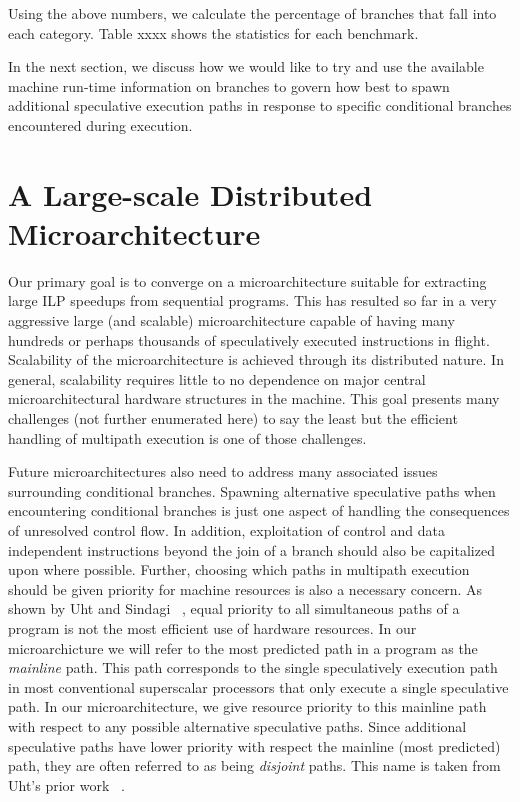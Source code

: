 \documentclass[10pt,dvips]{article}
\begin{document}
Using the above numbers, we calculate the percentage of branches 
that fall into each category.  
Table xxxx shows the statistics for each benchmark.  



In the next section, we discuss how we would like to try and
use the available machine run-time information on branches to
govern how best to spawn additional speculative execution paths
in response to specific conditional branches encountered during execution.
%
\section{A Large-scale Distributed Microarchitecture}
%
Our primary goal is to converge on a microarchitecture suitable
for extracting large ILP speedups from sequential programs.
This has resulted so far in a very aggressive large (and scalable)
microarchitecture capable of having many hundreds or perhaps thousands
of speculatively executed instructions in flight.  Scalability
of the microarchitecture is achieved through its distributed nature.
In general, scalability requires little to no dependence on major
central microarchitectural hardware structures in the machine.
This goal presents many challenges (not further enumerated here)
to say the least but the efficient handling of multipath execution
is one of those challenges.  

Future microarchitectures also need to 
address many associated issues surrounding conditional branches.
Spawning alternative speculative paths when encountering conditional
branches is just one aspect of handling the consequences of
unresolved control flow.
In addition, exploitation
of control
and data independent instructions beyond the join of a branch should
also be capitalized upon where possible.
Further, choosing which paths in multipath execution should
be given priority for machine resources is also a necessary concern.
As shown by Uht and Sindagi ~\cite{Uht95},
equal priority to all simultaneous paths
of a program is not the most efficient use of hardware resources.
In our microarchicture we will refer to the most predicted path
in a program as the 
\textit{mainline} path.  
This path corresponds to the single speculatively
execution path in most conventional superscalar processors that only
execute a single speculative path.  In our microarchitecture,
we give resource priority to this mainline path with respect
to any possible alternative speculative paths.  
Since additional speculative paths have lower priority with
respect the mainline (most predicted) path, they are often referred
to as being
\textit{disjoint} paths.  
This name is taken from Uht's 
prior work ~\cite{Uht95}.
\end{document}
